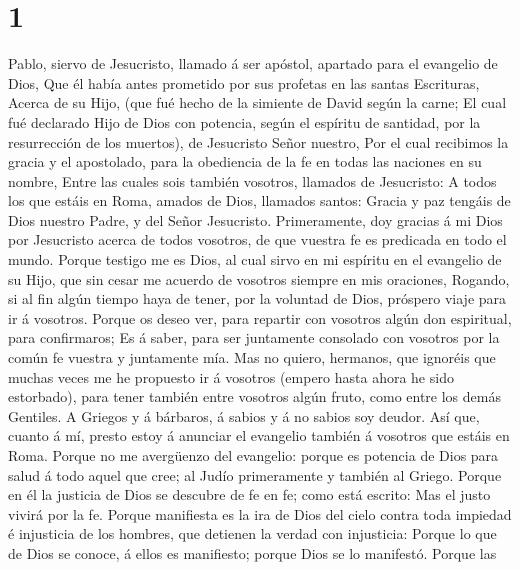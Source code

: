 \hypertarget{section}{%
\section{1}\label{section}}

 Pablo, siervo de Jesucristo, llamado á ser apóstol,
apartado para el evangelio de Dios,  Que él había antes
prometido por sus profetas en las santas Escrituras, 
Acerca de su Hijo, (que fué hecho de la simiente de David según la
carne;  El cual fué declarado Hijo de Dios con potencia,
según el espíritu de santidad, por la resurrección de los muertos), de
Jesucristo Señor nuestro,  Por el cual recibimos la gracia
y el apostolado, para la obediencia de la fe en todas las naciones en su
nombre,  Entre las cuales sois también vosotros, llamados
de Jesucristo:  A todos los que estáis en Roma, amados de
Dios, llamados santos: Gracia y paz tengáis de Dios nuestro Padre, y del
Señor Jesucristo.  Primeramente, doy gracias á mi Dios por
Jesucristo acerca de todos vosotros, de que vuestra fe es predicada en
todo el mundo.  Porque testigo me es Dios, al cual sirvo
en mi espíritu en el evangelio de su Hijo, que sin cesar me acuerdo de
vosotros siempre en mis oraciones,  Rogando, si al fin
algún tiempo haya de tener, por la voluntad de Dios, próspero viaje para
ir á vosotros.  Porque os deseo ver, para repartir con
vosotros algún don espiritual, para confirmaros;  Es á
saber, para ser juntamente consolado con vosotros por la común fe
vuestra y juntamente mía.  Mas no quiero, hermanos, que
ignoréis que muchas veces me he propuesto ir á vosotros (empero hasta
ahora he sido estorbado), para tener también entre vosotros algún fruto,
como entre los demás Gentiles.  A Griegos y á bárbaros, á
sabios y á no sabios soy deudor.  Así que, cuanto á mí,
presto estoy á anunciar el evangelio también á vosotros que estáis en
Roma.  Porque no me avergüenzo del evangelio: porque es
potencia de Dios para salud á todo aquel que cree; al Judío primeramente
y también al Griego.  Porque en él la justicia de Dios se
descubre de fe en fe; como está escrito: Mas el justo vivirá por la fe.
 Porque manifiesta es la ira de Dios del cielo contra
toda impiedad é injusticia de los hombres, que detienen la verdad con
injusticia:  Porque lo que de Dios se conoce, á ellos es
manifiesto; porque Dios se lo manifestó.  Porque las
